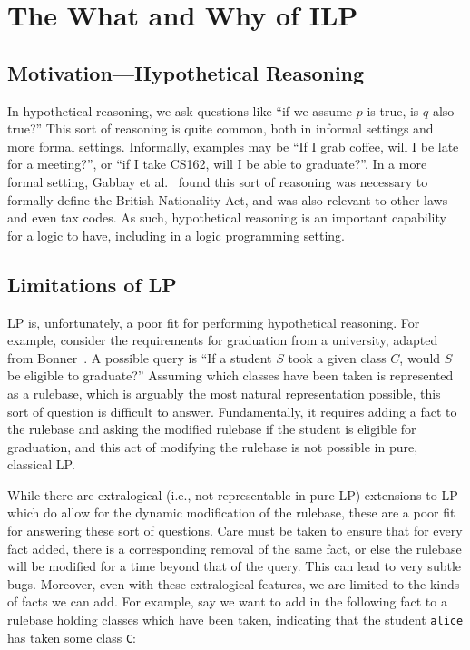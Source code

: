 \section{The What and Why of ILP}
\subsection{Motivation---Hypothetical Reasoning}
In hypothetical reasoning, we ask questions like ``if we assume $p$ is true, is $q$ also true?''
This sort of reasoning is quite common, both in informal settings and more formal settings.
Informally, examples may be ``If I grab coffee, will I be late for a meeting?'', or ``if I take CS162, will I be able to graduate?''.
In a more formal setting, Gabbay et al.~\cite{Gabbay} found this sort of reasoning was necessary to formally define the British Nationality Act, and was also relevant to other laws and even tax codes.
As such, hypothetical reasoning is an important capability for a logic to have, including in a logic programming setting.

\subsection{Limitations of LP}
\label{sec:lp_limitations}
LP is, unfortunately, a poor fit for performing hypothetical reasoning.
For example, consider the requirements for graduation from a university, adapted from Bonner~\cite{Bonner88}.
A possible query is ``If a student $S$ took a given class $C$, would $S$ be eligible to graduate?''
Assuming which classes have been taken is represented as a rulebase, which is arguably the most natural representation possible, this sort of question is difficult to answer.
Fundamentally, it requires adding a fact to the rulebase and asking the modified rulebase if the student is eligible for graduation, and this act of modifying the rulebase is not possible in pure, classical LP.

While there are extralogical (i.e., not representable in pure LP) extensions to LP which do allow for the dynamic modification of the rulebase, these are a poor fit for answering these sort of questions.
Care must be taken to ensure that for every fact added, there is a corresponding removal of the same fact, or else the rulebase will be modified for a time beyond that of the query.
This can lead to very subtle bugs.
Moreover, even with these extralogical features, we are limited to the kinds of facts we can add.
For example, say we want to add in the following fact to a rulebase holding classes which have been taken, indicating that the student \texttt{alice} has taken some class \texttt{C}:

